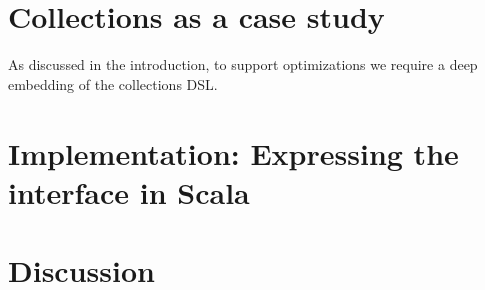 \section{Collections as a case study}
\label{sec:caseStudy}
As discussed in the introduction, to support optimizations we require a deep embedding of the collections DSL\@.


\section{Implementation: Expressing the interface in Scala}
\label{sec:intfScala}


\section{Discussion}
\label{sec:discussion}



